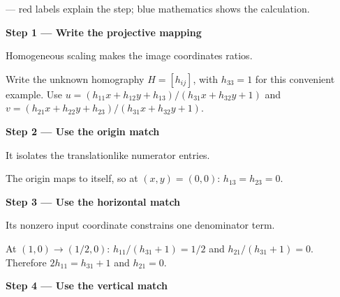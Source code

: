 \documentclass[letterpaper,11pt,english,openany,oneside]{jupyterBook}
\begin{document}
\sphinxAtStartPar
{} — red labels explain the step; blue mathematics shows the calculation.

\par\medskip{}
{\color{QuizStepRed}\bfseries Step 1 — Write the projective mapping}\par\smallskip

\sphinxAtStartPar
{} Homogeneous scaling makes the image coordinates ratios.

\sphinxAtStartPar
Write the unknown homography {\color{QuizMathBlue} \(H=[h_{ij}]\)}, with {\color{QuizMathBlue} \(h_{33}=1\)} for this convenient example. Use {\color{QuizMathBlue} \(u=(h_{11}x+h_{12}y+h_{13})/(h_{31}x+h_{32}y+1)\)} and {\color{QuizMathBlue} \(v=(h_{21}x+h_{22}y+h_{23})/(h_{31}x+h_{32}y+1)\)}.

\par

\par\medskip{}
{\color{QuizStepRed}\bfseries Step 2 — Use the origin match}\par\smallskip

\sphinxAtStartPar
{} It isolates the translation\sphinxhyphen{}like numerator entries.

\sphinxAtStartPar
The origin maps to itself, so at {\color{QuizMathBlue} \((x,y)=(0,0)\)}: {\color{QuizMathBlue} \(h_{13}=h_{23}=0\)}.

\par

\par\medskip{}
{\color{QuizStepRed}\bfseries Step 3 — Use the horizontal match}\par\smallskip

\sphinxAtStartPar
{} Its nonzero input coordinate constrains one denominator term.

\sphinxAtStartPar
At {\color{QuizMathBlue} \((1,0)\to(1/2,0)\)}: {\color{QuizMathBlue} \(h_{11}/(h_{31}+1)=1/2\)} and {\color{QuizMathBlue} \(h_{21}/(h_{31}+1)=0\)}. Therefore {\color{QuizMathBlue} \(2h_{11}=h_{31}+1\)} and {\color{QuizMathBlue} \(h_{21}=0\)}.

\par

\par\medskip{}
{\color{QuizStepRed}\bfseries Step 4 — Use the vertical match}\par\smallskip
\end{document}
